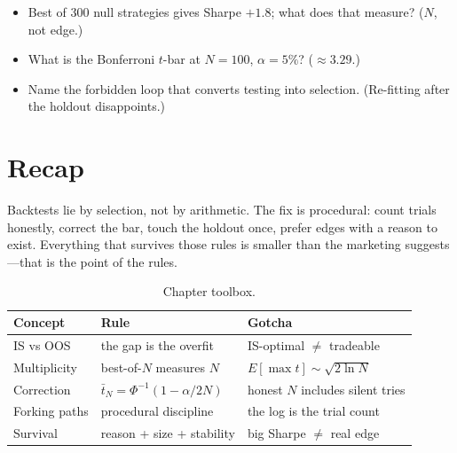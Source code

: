 \begin{checkpoint}
\begin{itemize}
\item Best of 300 null strategies gives Sharpe $+1.8$; what does that measure? ($N$, not
edge.)
\item What is the Bonferroni $t$-bar at $N{=}100$, $\alpha=5\%$? ($\approx3.29$.)
\item Name the forbidden loop that converts testing into selection. (Re-fitting after the
holdout disappoints.)
\end{itemize}
\end{checkpoint}

\section{Recap}\label{sec:liesrecap}

Backtests lie by selection, not by arithmetic. The fix is procedural: count trials
honestly, correct the bar, touch the holdout once, prefer edges with a reason to exist.
Everything that survives those rules is smaller than the marketing suggests---that is
the point of the rules.

\begin{table}[htbp]\centering\small
\caption{Chapter toolbox.}
\begin{tabular}{@{}lll@{}}
\toprule
Concept & Rule & Gotcha\\
\midrule
IS vs OOS & the gap is the overfit & IS-optimal $\neq$ tradeable\\
Multiplicity & best-of-$N$ measures $N$ & $E[\max t]\sim\sqrt{2\ln N}$\\
Correction & $\bar t_N=\Phi^{-1}(1-\alpha/2N)$ & honest $N$ includes silent tries\\
Forking paths & procedural discipline & the log is the trial count\\
Survival & reason + size + stability & big Sharpe $\neq$ real edge\\
\bottomrule
\end{tabular}
\end{table}

